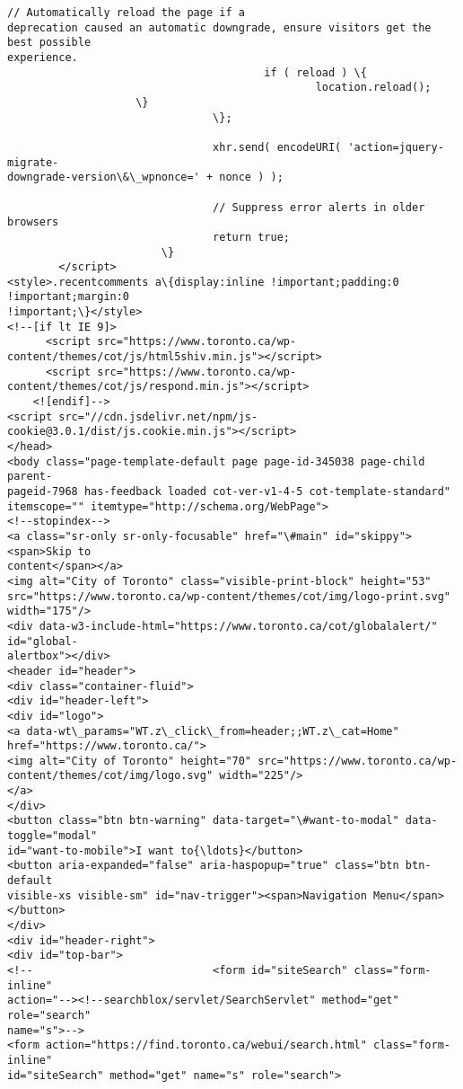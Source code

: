 \documentclass[11pt]{article}
\begin{document}
\begin{Verbatim}[commandchars=\\\{\}]
                                        // Automatically reload the page if a
deprecation caused an automatic downgrade, ensure visitors get the best possible
experience.
                                        if ( reload ) \{
                                                location.reload();
                    \}
                                \};

                                xhr.send( encodeURI( 'action=jquery-migrate-
downgrade-version\&\_wpnonce=' + nonce ) );

                                // Suppress error alerts in older browsers
                                return true;
                        \}
        </script>
<style>.recentcomments a\{display:inline !important;padding:0 !important;margin:0
!important;\}</style>
<!--[if lt IE 9]>
      <script src="https://www.toronto.ca/wp-
content/themes/cot/js/html5shiv.min.js"></script>
      <script src="https://www.toronto.ca/wp-
content/themes/cot/js/respond.min.js"></script>
    <![endif]-->
<script src="//cdn.jsdelivr.net/npm/js-
cookie@3.0.1/dist/js.cookie.min.js"></script>
</head>
<body class="page-template-default page page-id-345038 page-child parent-
pageid-7968 has-feedback loaded cot-ver-v1-4-5 cot-template-standard"
itemscope="" itemtype="http://schema.org/WebPage">
<!--stopindex-->
<a class="sr-only sr-only-focusable" href="\#main" id="skippy"><span>Skip to
content</span></a>
<img alt="City of Toronto" class="visible-print-block" height="53"
src="https://www.toronto.ca/wp-content/themes/cot/img/logo-print.svg"
width="175"/>
<div data-w3-include-html="https://www.toronto.ca/cot/globalalert/" id="global-
alertbox"></div>
<header id="header">
<div class="container-fluid">
<div id="header-left">
<div id="logo">
<a data-wt\_params="WT.z\_click\_from=header;;WT.z\_cat=Home"
href="https://www.toronto.ca/">
<img alt="City of Toronto" height="70" src="https://www.toronto.ca/wp-
content/themes/cot/img/logo.svg" width="225"/>
</a>
</div>
<button class="btn btn-warning" data-target="\#want-to-modal" data-toggle="modal"
id="want-to-mobile">I want to{\ldots}</button>
<button aria-expanded="false" aria-haspopup="true" class="btn btn-default
visible-xs visible-sm" id="nav-trigger"><span>Navigation Menu</span></button>
</div>
<div id="header-right">
<div id="top-bar">
<!--                            <form id="siteSearch" class="form-inline"
action="--><!--searchblox/servlet/SearchServlet" method="get" role="search"
name="s">-->
<form action="https://find.toronto.ca/webui/search.html" class="form-inline"
id="siteSearch" method="get" name="s" role="search">

\end{Verbatim}
\end{document}
